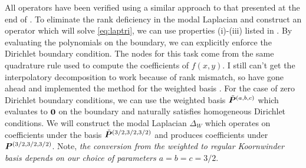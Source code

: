 All operators have been verified using a similar approach to that presented at the end of . To eliminate the rank deficiency in the modal Laplacian and construct an operator which will solve \eqref{eq:laptri}, we can use properties (i)-(iii) listed in . By evaluating the polynomials on the boundary, we can explicitly enforce the Dirichlet boundary condition. The nodes for this task come from the same quadrature rule used to compute the coefficients of $f(x,y)$. \color{red} I still can't get the interpolatory decomposition to work because of rank mismatch, so have gone ahead and implemented the method for the weighted basis \color{black}. For the case of zero Dirichlet boundary conditions, we can use the weighted basis $\tilde{\boldsymbol{P}}^{(a,b,c)}$ which evaluates to $\boldsymbol{0}$ on the boundary and naturally satisfies homogeneous Dirichlet conditions. We will construct the modal Laplacian $\Delta_W$ which operates on coefficients under the basis $\tilde{\boldsymbol{P}}^{(3/2,3/2,3/2)}$ and produces coefficients under $\boldsymbol{P}^{(3/2,3/2,3/2)}$. Note, \emph{the conversion from the weighted to regular Koornwinder basis depends on our choice of parameters $a=b=c=3/2$}. 


